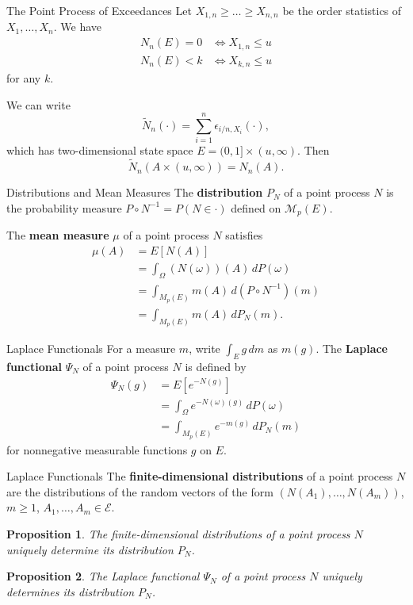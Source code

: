 \documentclass{beamer}
\newtheorem{proposition}{Proposition}
\begin{document}
\begin{frame}{The Point Process of Exceedances}
    Let $X_{1, n} \ge \ldots \ge X_{n, n}$ be the order statistics of $X_1, \ldots, X_n$. We have
    \begin{align*}
        N_n(E) = 0 &\iff X_{1, n} \le u \\
        N_n(E) < k &\iff X_{k, n} \le u
    \end{align*}
    for any $k$.

    \smallskip

    We can write
    \[
    \tilde{N}_n(\cdot) = \sum_{i = 1}^n \epsilon_{i / n, X_i}(\cdot),
    \]
    which has two-dimensional state space $E = (0, 1] \times (u, \infty)$. Then
    \[
    \tilde{N}_n(A \times (u, \infty)) = N_n(A).
    \]
\end{frame}

\begin{frame}{Distributions and Mean Measures}
    The \textbf{distribution} $P_N$ of a point process $N$ is the probability measure $P \circ N^{-1} = P(N \in \cdot)$ defined on $\mathcal{M}_p(E)$.

    \smallskip

    The \textbf{mean measure} $\mu$ of a point process $N$ satisfies
    \begin{align*}
        \mu(A) &= E[N(A)] \\
        &= \int_{\Omega} (N(\omega))(A)\,dP(\omega) \\
        &= \int_{M_p(E)} m(A)\,d(P \circ N^{-1})(m) \\
        &= \int_{M_p(E)} m(A)\,dP_N(m).
    \end{align*}
\end{frame}

\begin{frame}{Laplace Functionals}
    For a measure $m$, write $\int_E g\,dm$ as $m(g)$. The \textbf{Laplace functional} $\Psi_N$ of a point process $N$ is defined by
    \begin{align*}
        \Psi_N(g) &= E[e^{-N(g)}] \\
        &= \int_{\Omega} e^{-N(\omega)(g)}\,dP(\omega) \\
        &= \int_{M_p(E)} e^{-m(g)}\,dP_N(m)
    \end{align*}
    for nonnegative measurable functions $g$ on $E$.
\end{frame}

\begin{frame}{Laplace Functionals}
    The \textbf{finite-dimensional distributions} of a point process $N$ are the distributions of the random vectors of the form $(N(A_1), \ldots, N(A_m))$, $m \ge 1$, $A_1, \ldots, A_m \in \mathcal{E}$.
    \begin{proposition}
        The finite-dimensional distributions of a point process $N$ uniquely determine its distribution $P_N$.
    \end{proposition}
    \begin{proposition}
        The Laplace functional $\Psi_N$ of a point process $N$ uniquely determines its distribution $P_N$.
    \end{proposition}
\end{frame}
\end{document}
